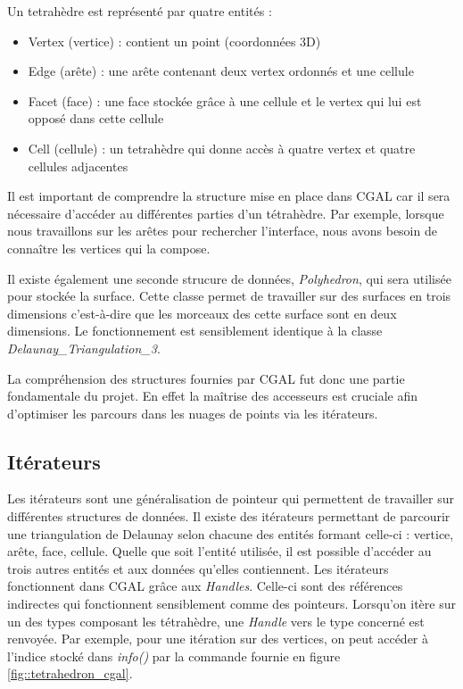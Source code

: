 Un tetrahèdre est représenté par quatre entités :
\begin{itemize}
  \item Vertex (vertice) : contient un point (coordonnées 3D)
  \item Edge (arête) : une arête contenant deux vertex ordonnés et une cellule
  \item Facet (face) : une face stockée grâce à une cellule et le vertex qui lui est opposé dans cette cellule
  \item Cell (cellule) : un tetrahèdre qui donne accès à quatre vertex et quatre cellules adjacentes
\end{itemize}

Il est important de comprendre la structure mise en place dans CGAL car il sera
nécessaire d'accéder au différentes parties d'un tétrahèdre. Par exemple, lorsque
nous travaillons sur les arêtes pour rechercher l'interface, nous avons besoin de
connaître les vertices qui la compose.

Il existe également une seconde strucure de données, \textit{Polyhedron}, qui sera
utilisée pour stockée la surface. Cette classe permet de travailler sur des surfaces
en trois dimensions c'est-à-dire que les morceaux des cette surface sont en deux dimensions.
Le fonctionnement est sensiblement identique à la classe \textit{Delaunay\_Triangulation\_3}.

La compréhension des structures fournies par CGAL fut donc une partie fondamentale du
projet. En effet la maîtrise des accesseurs est cruciale afin d'optimiser les parcours
dans les nuages de points via les itérateurs.





\subsection*{Itérateurs}

Les itérateurs sont une généralisation de pointeur qui permettent de travailler sur
différentes structures de données.
Il existe des itérateurs permettant de parcourir une triangulation de Delaunay
selon chacune des entités formant celle-ci : vertice, arête, face, cellule. Quelle
que soit l'entité utilisée, il est possible d'accéder au trois autres entités et
aux données qu'elles contiennent. Les itérateurs fonctionnent dans CGAL grâce aux
\textit{Handles}. Celle-ci sont des références indirectes qui fonctionnent sensiblement
comme des pointeurs. Lorsqu'on itère sur un des types composant les tétrahèdre, une
\textit{Handle} vers le type concerné est renvoyée. Par exemple, pour une itération sur des
vertices, on peut accéder à l'indice stocké dans \textit{info()} par la commande
fournie en figure \ref{fig::tetrahedron_cgal}.

